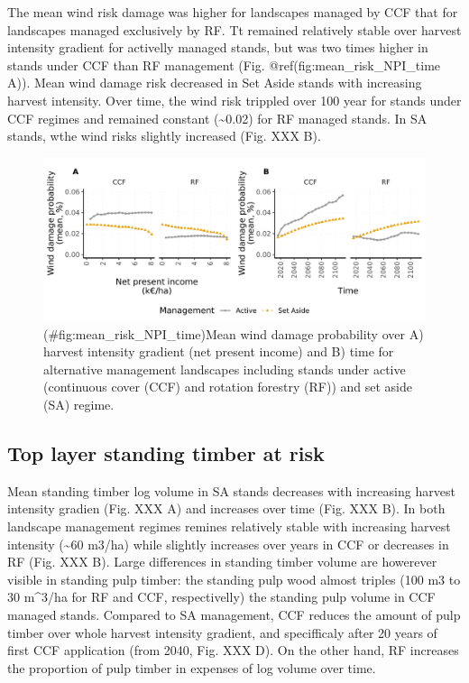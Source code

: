\documentclass[]{elsarticle} %
\makeatletter
\def\maxwidth{\ifdim\Gin@nat@width>\linewidth\linewidth
\else\Gin@nat@width\fi}
\let\Oldincludegraphics\includegraphics
\renewcommand{\includegraphics}[1]{\Oldincludegraphics[width=\maxwidth]{#1}}
\makeatother
\begin{document}
The mean wind risk damage was higher for landscapes managed by CCF that for landscapes managed exclusively by RF. Tt remained relatively stable over harvest intensity gradient for activelly managed stands, but was two times higher in stands under CCF than RF management (Fig. @ref(fig:mean\_risk\_NPI\_time A)). Mean wind damage risk decreased in Set Aside stands with increasing harvest intensity. Over time, the wind risk trippled over 100 year for stands under CCF regimes and remained constant (\textasciitilde{}0.02) for RF managed stands. In SA stands, wthe wind risks slightly increased (Fig. XXX B).

\begin{figure}
\centering
\includegraphics{test_manus4_puhti_files/figure-latex/mean_risk_NPI_time-1.pdf}
\caption{(\#fig:mean\_risk\_NPI\_time)Mean wind damage probability over A) harvest intensity gradient (net present income) and B) time for alternative management landscapes including stands under active (continuous cover (CCF) and rotation forestry (RF)) and set aside (SA) regime.}
\end{figure}

\hypertarget{top-layer-standing-timber-at-risk}{%
\subsection{Top layer standing timber at risk}\label{top-layer-standing-timber-at-risk}}

Mean standing timber log volume in SA stands decreases with increasing harvest intensity gradien (Fig. XXX A) and increases over time (Fig. XXX B). In both landscape management regimes remines relatively stable with increasing harvest intensity (\textasciitilde{}60 m3/ha) while slightly increases over years in CCF or decreases in RF (Fig. XXX B). Large differences in standing timber volume are howerever visible in standing pulp timber: the standing pulp wood almost triples (100 m3 to 30 m\^{}3/ha for RF and CCF, respectivelly) the standing pulp volume in CCF managed stands. Compared to SA management, CCF reduces the amount of pulp timber over whole harvest intensity gradient, and specifficaly after 20 years of first CCF application (from 2040, Fig. XXX D). On the other hand, RF increases the proportion of pulp timber in expenses of log volume over time.
\end{document}

